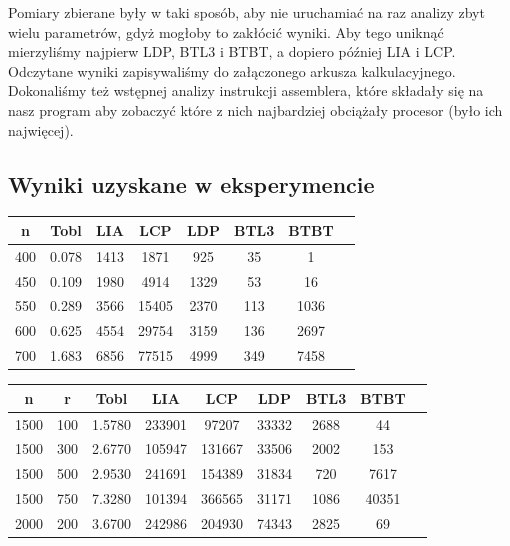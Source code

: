 \documentclass[10pt,a4paper]{article}
\begin{document}
Pomiary zbierane były w taki sposób, aby nie uruchamiać na raz analizy zbyt wielu
parametrów, gdyż mogłoby to zakłócić wyniki. Aby tego uniknąć mierzyliśmy najpierw
LDP, BTL3 i BTBT, a dopiero później LIA i LCP. Odczytane wyniki zapisywaliśmy do
załączonego arkusza kalkulacyjnego. Dokonaliśmy też wstępnej analizy instrukcji
assemblera, które składały się na nasz program aby zobaczyć które z nich najbardziej
obciążały procesor (było ich najwięcej).
\subsection{Wyniki uzyskane w eksperymencie}
\begin{center}
	\begin{tabular}{ |c|c|c|c|c|c|c|c| }
		\hline
		n   & Tobl  & LIA  & LCP   & LDP  & BTL3 & BTBT \\
		\hline
		400 & 0.078 & 1413 & 1871  & 925  & 35   & 1    \\
		\hline
		450 & 0.109 & 1980 & 4914  & 1329 & 53   & 16   \\
		\hline
		550 & 0.289 & 3566 & 15405 & 2370 & 113  & 1036 \\
		\hline
		600 & 0.625 & 4554 & 29754 & 3159 & 136  & 2697 \\
		\hline
		700 & 1.683 & 6856 & 77515 & 4999 & 349  & 7458 \\
		\hline
	\end{tabular}
\end{center}

\begin{center}
	\begin{tabular}{ |c|c|c|c|c|c|c|c|c| }
		\hline
		n    & r   & Tobl   & LIA    & LCP    & LDP   & BTL3 & BTBT  \\
		\hline
		1500 & 100 & 1.5780 & 233901 & 97207  & 33332 & 2688 & 44    \\
		\hline
		1500 & 300 & 2.6770 & 105947 & 131667 & 33506 & 2002 & 153   \\
		\hline
		1500 & 500 & 2.9530 & 241691 & 154389 & 31834 & 720  & 7617  \\
		\hline
		1500 & 750 & 7.3280 & 101394 & 366565 & 31171 & 1086 & 40351 \\
		\hline
		\hline
		2000 & 200 & 3.6700 & 242986 & 204930 & 74343 & 2825 & 69    \\
		\hline
	\end{tabular}
\end{center}
\end{document}
